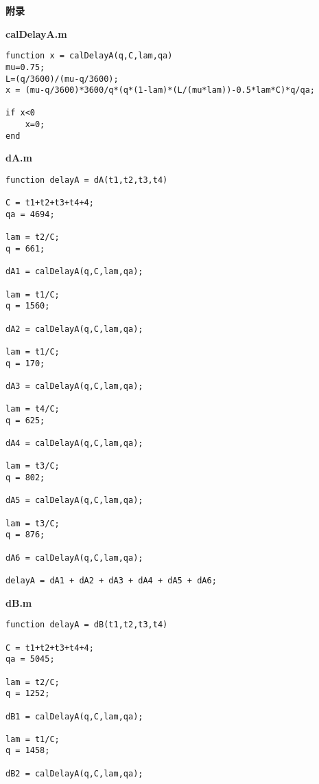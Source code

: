 \documentclass[a4paper,12pt]{article}
\begin{document}
\begin{CJK*}{UTF8}{gbsn}

\begin{center}
\textbf{\Large{附录}}
\end{center}
\noindent\textbf{calDelayA.m}
\vspace{-15pt}
\lstset{basicstyle=\ttfamily\footnotesize,escapechar=`}
\begin{lstlisting}
function x = calDelayA(q,C,lam,qa)
mu=0.75;
L=(q/3600)/(mu-q/3600);
x = (mu-q/3600)*3600/q*(q*(1-lam)*(L/(mu*lam))-0.5*lam*C)*q/qa;

if x<0
    x=0;
end
\end{lstlisting}

\noindent\textbf{dA.m}
\vspace{-15pt}
\lstset{basicstyle=\ttfamily\footnotesize,escapechar=`}
\begin{lstlisting}
function delayA = dA(t1,t2,t3,t4)

C = t1+t2+t3+t4+4;
qa = 4694;

lam = t2/C;
q = 661;

dA1 = calDelayA(q,C,lam,qa);

lam = t1/C;
q = 1560;

dA2 = calDelayA(q,C,lam,qa);

lam = t1/C;
q = 170;

dA3 = calDelayA(q,C,lam,qa);

lam = t4/C;
q = 625;

dA4 = calDelayA(q,C,lam,qa);

lam = t3/C;
q = 802;

dA5 = calDelayA(q,C,lam,qa);

lam = t3/C;
q = 876;

dA6 = calDelayA(q,C,lam,qa);

delayA = dA1 + dA2 + dA3 + dA4 + dA5 + dA6;

\end{lstlisting}
\noindent\textbf{dB.m}
\vspace{-15pt}
\lstset{basicstyle=\ttfamily\footnotesize,escapechar=`}
\begin{lstlisting}
function delayA = dB(t1,t2,t3,t4)

C = t1+t2+t3+t4+4;
qa = 5045;

lam = t2/C;
q = 1252;

dB1 = calDelayA(q,C,lam,qa);

lam = t1/C;
q = 1458;

dB2 = calDelayA(q,C,lam,qa);


\end{lstlisting}
\end{CJK*}
\end{document}
